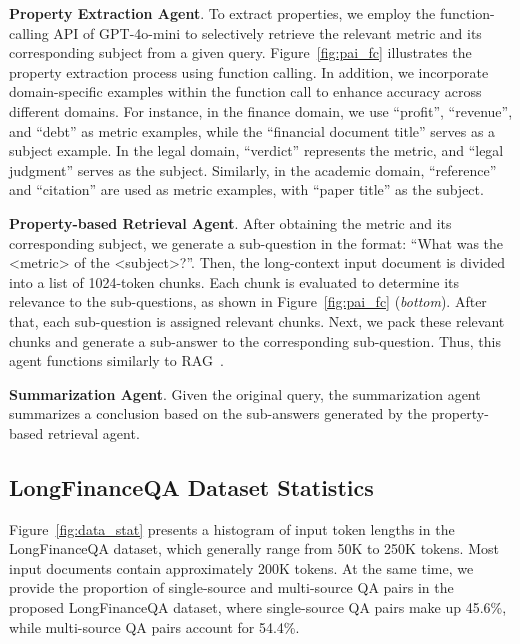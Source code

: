 \noindent \textbf{Property Extraction Agent}.
To extract properties, we employ the function-calling API of GPT-4o-mini to selectively retrieve the relevant metric and its corresponding subject from a given query. Figure~\ref{fig:pai_fc} illustrates the property extraction process using function calling.
In addition, we incorporate domain-specific examples within the function call to enhance accuracy across different domains. For instance, in the finance domain, we use ``profit'', ``revenue'', and ``debt'' as metric examples, while the ``financial document title'' serves as a subject example. In the legal domain, ``verdict'' represents the metric, and ``legal judgment'' serves as the subject. Similarly, in the academic domain, ``reference'' and ``citation'' are used as metric examples, with ``paper title'' as the subject.








\noindent \textbf{Property-based Retrieval Agent}. After obtaining the metric and its corresponding subject, we generate a sub-question in the format: ``What was the <metric> of the <subject>?''. Then, the long-context input document is divided into a list of 1024-token chunks. Each chunk is evaluated to determine its relevance to the sub-questions, as shown in Figure~\ref{fig:pai_fc} (\textit{bottom}). After that, each sub-question is assigned relevant chunks. Next, we pack these relevant chunks and generate a sub-answer to the corresponding sub-question. Thus, this agent functions similarly to RAG~\cite{lewis2020retrieval}.

\noindent \textbf{Summarization Agent}. Given the original query, the summarization agent summarizes a conclusion based on the sub-answers generated by the property-based retrieval agent.







\subsection{LongFinanceQA Dataset Statistics}
Figure~\ref{fig:data_stat} presents a histogram of input token lengths in the LongFinanceQA dataset, which generally range from 50K to 250K tokens. Most input documents contain approximately 200K tokens. At the same time, we provide the proportion of single-source and multi-source QA pairs in the proposed LongFinanceQA dataset, where single-source QA pairs make up 45.6\%, while multi-source QA pairs account for 54.4\%.

